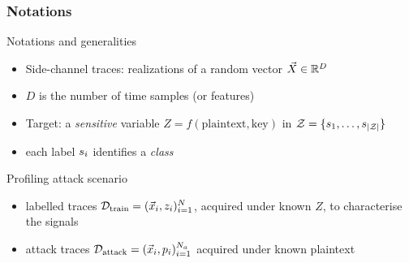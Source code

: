\begin{frame}
\frametitle{Notations}
\begin{block}{Notations and generalities}
\begin{itemize}
\item Side-channel traces: realizations of a random vector $\vec{X} \in \mathbb{R}^D$  
\item $D$ is the number of time samples (or features)
\item Target: a \emph{sensitive} variable $Z = f(\mathrm{plaintext,key})$ in $\mathcal{Z} = \{s_{1}, \dots, s_{|\mathcal{Z}|}\}$
\item each label $s_{i}$ identifies a \emph{class}
\end{itemize}
\end{block}
\vspace{-5pt}
\begin{block}{Profiling attack scenario}
\begin{itemize}
\item labelled traces $\mathcal{D}_{\text{train}} = (\vec{x}_i, z_i)_{i=1}^N$, acquired under known $Z$, to characterise the signals
\item attack traces $\mathcal{D}_{\text{attack}} = (\vec{x}_i, p_i)_{i=1}^{N_a}$ acquired under known plaintext
\end{itemize}
\end{block}
\end{frame}




